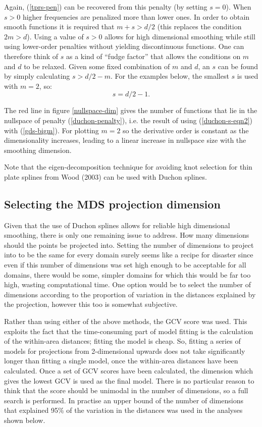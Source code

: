 \documentclass[useAMS,referee, usegraphicx]{biom}
\begin{document}
Again, (\ref{tprs-pen}) can be recovered from this penalty (by setting $s=0$). When $s>0$ higher frequencies are penalized more than lower ones. In order to obtain smooth functions it is required that $m+s>d/2$ (this replaces the condition $2m>d$). Using a value of $s>0$ allows for high dimensional smoothing while still using lower-order penalties without yielding discontinuous functions. One can therefore think of $s$ as a kind of ``fudge factor'' that allows the conditions on $m$ and $d$ to be relaxed. Given some fixed combination of $m$ and $d$, an $s$ can be found by simply calculating $s>d/2-m$. For the examples below, the smallest $s$ is used with $m=2$, so:
\begin{equation}
s=d/2-1.
\label{duchon-s-eqn2}
\end{equation}

The red line in figure \ref{nullspace-dim} gives the number of functions that lie in the nullspace of penalty (\ref{duchon-penalty}), i.e. the result of using (\ref{duchon-s-eqn2}) with (\ref{gds-bigm}). For plotting $m=2$ so the derivative order is constant as the dimensionality increases, leading to a linear increase in nullspace size with the smoothing dimension.

Note that the eigen-decomposition technique for avoiding knot selection for thin plate splines from Wood (2003) can be used with Duchon splines.

\subsection{Selecting the MDS projection dimension}

Given that the use of Duchon splines allows for reliable high dimensional smoothing, there is only one remaining issue to address. How many dimensions should the points be projected into. Setting the number of dimensions to project into to be the same for every domain surely seems like a recipe for disaster since even if this number of dimensions was set high enough to be acceptable for all domains, there would be some, simpler domains for which this would be far too high, wasting computational time. One option would be to select the number of dimensions according to the proportion of variation in the distances explained by the projection, however this too is somewhat subjective.

Rather than using either of the above methods, the GCV score was used. This exploits the fact that the time-consuming part of model fitting is the calculation of the within-area distances; fitting the model is cheap. So, fitting a series of models for projections from 2-dimensional upwards does not take significantly longer than fitting a single model, once the within-area distances have been calculated. Once a set of GCV scores have been calculated, the dimension which gives the lowest GCV is used as the final model. There is no particular reason to think that the score should be unimodal in the number of dimensions, so a full search is performed. In practise an upper bound of the number of dimensions that explained 95\% of the variation in the distances was used in the analyses shown below.
\end{document}
